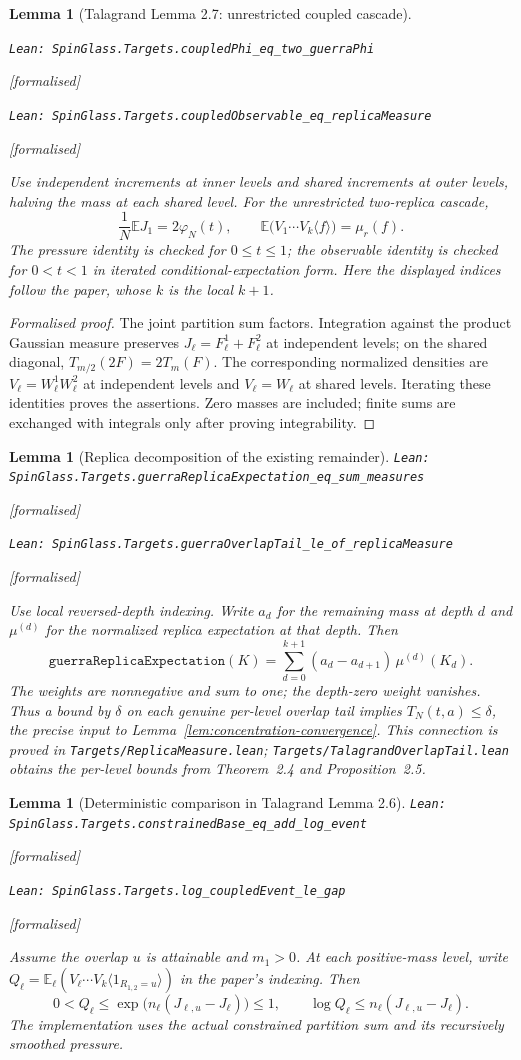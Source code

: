 \documentclass[11pt]{article}
\providecommand{\lean}[1]{\leavevmode\par\nopagebreak
  {\noindent\normalfont\footnotesize\raggedright\texttt{Lean: #1}\par}\nopagebreak}
\providecommand{\leanok}{\par\nopagebreak
  {\noindent\normalfont\footnotesize\textcolor{green!50!black}{[formalised]}\par}\nopagebreak}
\newtheorem{lemma}[theorem]{Lemma}
\begin{document}
\begin{lemma}[Talagrand Lemma 2.7: unrestricted coupled cascade]\label{lem:coupled-cascade}
\lean{SpinGlass.Targets.coupledPhi\_eq\_two\_guerraPhi}\leanok
\lean{SpinGlass.Targets.coupledObservable\_eq\_replicaMeasure}\leanok
Use independent increments at inner levels and shared increments at outer levels,
halving the mass at each shared level. For the unrestricted two-replica cascade,
\[
\frac1N\mathbb E J_1=2\varphi_N(t),\qquad
\mathbb E\bigl(V_1\cdots V_k\langle f\rangle\bigr)=\mu_r(f).
\]
The pressure identity is checked for $0\le t\le1$; the observable identity is
checked for $0<t<1$ in iterated conditional-expectation form.
Here the displayed indices follow the paper, whose $k$ is the local $k+1$.
\end{lemma}

\begin{proof}[Formalised proof]
The joint partition sum factors. Integration against the product Gaussian measure preserves
$J_\ell=F_\ell^1+F_\ell^2$ at independent levels; on the shared diagonal,
$T_{m/2}(2F)=2T_m(F)$. The corresponding normalized densities are
$V_\ell=W_\ell^1W_\ell^2$ at independent levels and $V_\ell=W_\ell$ at shared levels.
Iterating these identities proves the assertions. Zero masses are included;
finite sums are exchanged with integrals only after proving integrability.
\end{proof}

\begin{lemma}[Replica decomposition of the existing remainder]
\lean{SpinGlass.Targets.guerraReplicaExpectation\_eq\_sum\_measures}\leanok
\lean{SpinGlass.Targets.guerraOverlapTail\_le\_of\_replicaMeasure}\leanok
Use local reversed-depth indexing. Write $a_d$ for the remaining mass at depth $d$
and $\mu^{(d)}$ for the normalized replica expectation at that depth. Then
\[
\texttt{guerraReplicaExpectation}(K)
 =\sum_{d=0}^{k+1}(a_d-a_{d+1})\,\mu^{(d)}(K_d).
\]
The weights are nonnegative and sum to one; the depth-zero weight vanishes.
Thus a bound by $\delta$ on each genuine per-level overlap tail implies
$T_N(t,a)\le\delta$, the precise input to Lemma~\ref{lem:concentration-convergence}.
This connection is proved in \texttt{Targets/ReplicaMeasure.lean};
\texttt{Targets/TalagrandOverlapTail.lean} obtains the per-level bounds from
Theorem~2.4 and Proposition~2.5.
\end{lemma}

\begin{lemma}[Deterministic comparison in Talagrand Lemma 2.6]
\lean{SpinGlass.Targets.constrainedBase\_eq\_add\_log\_event}\leanok
\lean{SpinGlass.Targets.log\_coupledEvent\_le\_gap}\leanok
Assume the overlap $u$ is attainable and $m_1>0$. At each positive-mass level,
write $Q_\ell=\mathbb E_\ell(V_\ell\cdots V_k\langle 1_{R_{1,2}=u}\rangle)$
in the paper's indexing. Then
\[
0<Q_\ell\le \exp\bigl(n_\ell(J_{\ell,u}-J_\ell)\bigr)\le1,
\qquad
\log Q_\ell\le n_\ell(J_{\ell,u}-J_\ell).
\]
The implementation uses the actual constrained partition sum and its recursively
smoothed pressure.
\end{lemma}
\end{document}
